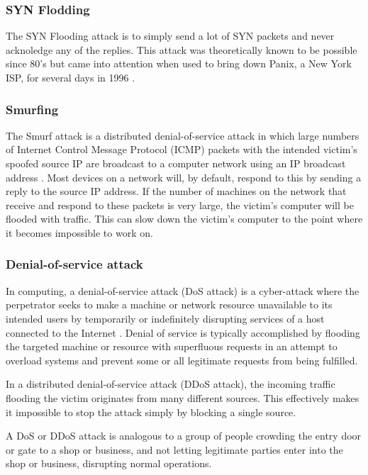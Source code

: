 \documentclass[12pt]{article}
\theoremstyle{definition}
\begin{document}
			\subsubsection{SYN Flodding}
			The SYN Flooding attack is to simply send a lot of SYN packets and never acknoledge any of the replies. This attack was theoretically known to be possible since 80's but came into attention when used to bring down Panix, a New York ISP, for several days in 1996 \cite{Gautam2016}.
 			
			\subsubsection{Smurfing}
			The Smurf attack is a distributed denial-of-service attack in which large numbers of Internet Control Message Protocol (ICMP) packets with the intended victim's spoofed source IP are broadcast to a computer network using an IP broadcast address \cite{Wang2010}. Most devices on a network will, by default, respond to this by sending a reply to the source IP address. If the number of machines on the network that receive and respond to these packets is very large, the victim's computer will be flooded with traffic. This can slow down the victim's computer to the point where it becomes impossible to work on.
			
			
			\subsubsection{Denial-of-service attack}
			In computing, a denial-of-service attack (DoS attack) is a cyber-attack where the perpetrator seeks to make a machine or network resource unavailable to its intended users by temporarily or indefinitely disrupting services of a host connected to the Internet \cite{Wang2010}. Denial of service is typically accomplished by flooding the targeted machine or resource with superfluous requests in an attempt to overload systems and prevent some or all legitimate requests from being fulfilled.
			
			In a distributed denial-of-service attack (DDoS attack), the incoming traffic flooding the victim originates from many different sources. This effectively makes it impossible to stop the attack simply by blocking a single source.
			
			A DoS or DDoS attack is analogous to a group of people crowding the entry door or gate to a shop or business, and not letting legitimate parties enter into the shop or business, disrupting normal operations.
			
\end{document}
